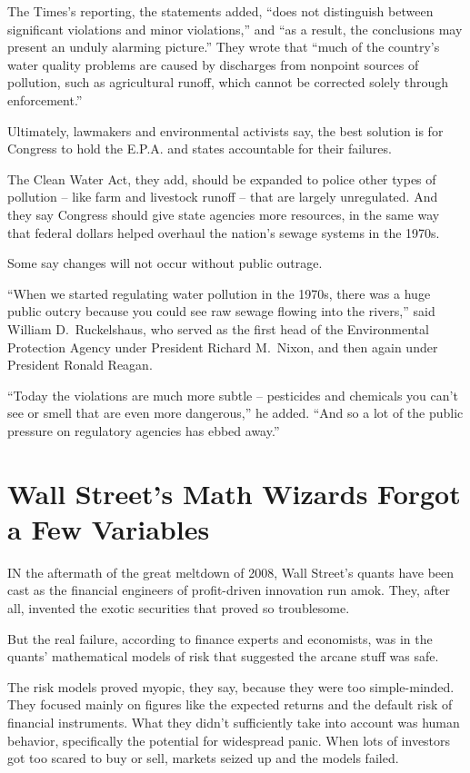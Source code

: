 ﻿\documentclass[12pt]{article}
\begin{document}
The Times's reporting, the statements added, ``does not distinguish between significant violations
and minor violations,'' and ``as a result, the conclusions may present an unduly alarming picture.''
They wrote that ``much of the country's water quality problems are caused by discharges from
nonpoint sources of pollution, such as agricultural runoff, which cannot be corrected solely through
enforcement.''

Ultimately, lawmakers and environmental activists say, the best solution is for Congress to hold the
E.P.A. and states accountable for their failures.

The Clean Water Act, they add, should be expanded to police other types of pollution -- like farm
and livestock runoff -- that are largely unregulated. And they say Congress should give state
agencies more resources, in the same way that federal dollars helped overhaul the nation's sewage
systems in the 1970s.

Some say changes will not occur without public outrage.

``When we started regulating water pollution in the 1970s, there was a huge public outcry because
you could see raw sewage flowing into the rivers,'' said William D.~Ruckelshaus, who served as the
first head of the Environmental Protection Agency under President Richard M.~Nixon, and then again
under President Ronald Reagan.

``Today the violations are much more subtle -- pesticides and chemicals you can't see or smell that
are even more dangerous,'' he added. ``And so a lot of the public pressure on regulatory agencies
has ebbed away.''

\section{Wall Street's Math Wizards Forgot a Few Variables}

\lettrine{I}{N} the aftermath of the great meltdown of 2008, Wall Street's quants have been cast as
the financial engineers of profit-driven innovation run amok. They, after all, invented the exotic
securities that proved so troublesome.

But the real failure, according to finance experts and economists, was in the quants' mathematical
models of risk that suggested the arcane stuff was safe.

The risk models proved myopic, they say, because they were too simple-minded. They focused mainly on
figures like the expected returns and the default risk of financial instruments. What they didn't
sufficiently take into account was human behavior, specifically the potential for widespread panic.
When lots of investors got too scared to buy or sell, markets seized up and the models failed.
\end{document}
